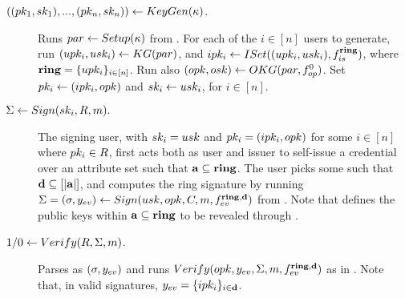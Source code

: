 

\begin{description}
\item[$((pk_1,sk_1),...,(pk_n,sk_n)) \gets KeyGen(\kappa)$.] Runs
  $par \gets Setup(\kappa)$ from \CUASGenHideIss. For each of
  the $i \in [n]$ users to generate, run $(upk_i,usk_i) \gets KG(par)$,
  and $ipk_i \gets ISet((upk_i,usk_i),f_{is}^{\mathbf{ring}})$, where $\mathbf{ring} =
  \lbrace upk_i \rbrace_{i\in[n]}$. Run also $(opk,osk) \gets OKG(par,
  f_{op}^0)$. Set $pk_i \gets (ipk_i,opk)$ and $sk_i \gets usk_i$, for
  $i\in[n]$.
\item[$\Sigma \gets Sign(sk_i,R,m).$]
  The signing user, with $sk_i=usk$ and $pk_i=(ipk_i,opk)$ for some $i \in
  [n]$ where $pk_i \in R$, first acts both as user and issuer to self-issue a
  credential \Cred over an attribute set \attrs such that $\mathbf{a} \subseteq
  \mathbf{ring}$. The user picks some \dattrs such that $\mathbf{d} \subseteq [|\mathbf{a}|]$,
  and computes the ring signature by running $\Sigma = (\sigma,y_{ev}) \gets
  Sign(usk,opk,C,m,f_{ev}^{\mathbf{ring},\mathbf{d}})$ from
  \CUASGenHideIss. Note that \dattrs defines the public keys within
  $\mathbf{a} \subseteq \mathbf{ring}$ to be revealed through \yeval.
\item[$1/0 \gets Verify(R,\Sigma,m)$.] Parses \Sig as $(\sigma,y_{ev})$ and
  runs $Verify(opk,y_{ev},\Sigma,m,f_{ev}^{\mathbf{ring},\mathbf{d}})$ as in
  \CUASGenHideIss. Note that, in valid signatures, $y_{ev} = \lbrace
  ipk_i\rbrace_{i\in\mathbf{d}}$.
\end{description}

